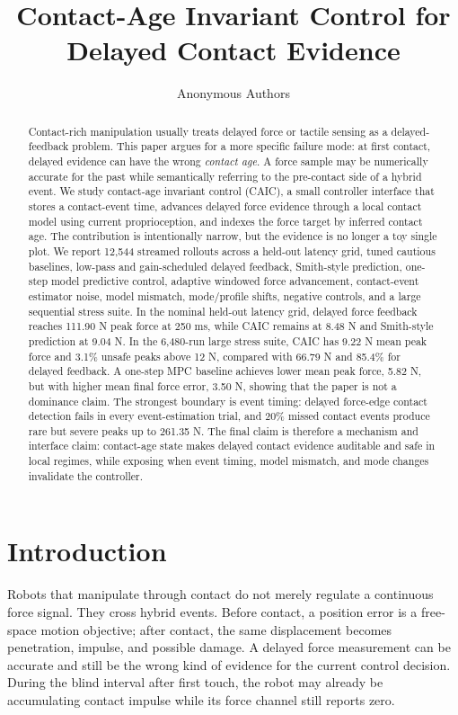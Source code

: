 \documentclass{article}
\title{Contact-Age Invariant Control for Delayed Contact Evidence}
\author{Anonymous Authors}
\newcommand{\caic}{CAIC}
\begin{document}
\maketitle

\begin{abstract}
Contact-rich manipulation usually treats delayed force or tactile sensing as a delayed-feedback problem. This paper argues for a more specific failure mode: at first contact, delayed evidence can have the wrong \emph{contact age}. A force sample may be numerically accurate for the past while semantically referring to the pre-contact side of a hybrid event. We study contact-age invariant control (\caic{}), a small controller interface that stores a contact-event time, advances delayed force evidence through a local contact model using current proprioception, and indexes the force target by inferred contact age. The contribution is intentionally narrow, but the evidence is no longer a toy single plot. We report 12,544 streamed rollouts across a held-out latency grid, tuned cautious baselines, low-pass and gain-scheduled delayed feedback, Smith-style prediction, one-step model predictive control, adaptive windowed force advancement, contact-event estimator noise, model mismatch, mode/profile shifts, negative controls, and a large sequential stress suite. In the nominal held-out latency grid, delayed force feedback reaches 111.90 N peak force at 250 ms, while \caic{} remains at 8.48 N and Smith-style prediction at 9.04 N. In the 6,480-run large stress suite, \caic{} has 9.22 N mean peak force and 3.1\% unsafe peaks above 12 N, compared with 66.79 N and 85.4\% for delayed feedback. A one-step MPC baseline achieves lower mean peak force, 5.82 N, but with higher mean final force error, 3.50 N, showing that the paper is not a dominance claim. The strongest boundary is event timing: delayed force-edge contact detection fails in every event-estimation trial, and 20\% missed contact events produce rare but severe peaks up to 261.35 N. The final claim is therefore a mechanism and interface claim: contact-age state makes delayed contact evidence auditable and safe in local regimes, while exposing when event timing, model mismatch, and mode changes invalidate the controller.
\end{abstract}

\section{Introduction}

Robots that manipulate through contact do not merely regulate a continuous force signal. They cross hybrid events. Before contact, a position error is a free-space motion objective; after contact, the same displacement becomes penetration, impulse, and possible damage. A delayed force measurement can be accurate and still be the wrong kind of evidence for the current control decision. During the blind interval after first touch, the robot may already be accumulating contact impulse while its force channel still reports zero.
\end{document}
